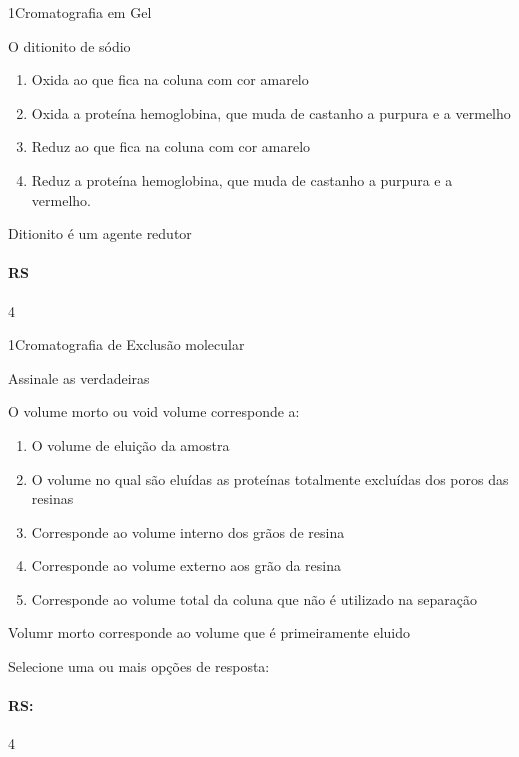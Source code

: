 \documentclass[\mainfilename]{subfiles}
\begin{document}
\begin{questionBox}1{Cromatografia em Gel}
    
    O ditionito de sódio
    \begin{enumerate}
        \item Oxida ao  que fica na coluna com cor amarelo
        \item Oxida a proteína hemoglobina, que muda de castanho a purpura e a vermelho
        \item Reduz ao  que fica na coluna com cor amarelo
        \item Reduz a proteína hemoglobina, que muda de castanho a purpura e a vermelho.
    \end{enumerate}

    Ditionito é um agente redutor

    \paragraph{RS} 4
    
\end{questionBox}

\begin{questionBox}1{Cromatografia de Exclusão molecular}
    
    Assinale as verdadeiras

    O volume morto ou void volume corresponde a:

    \begin{enumerate}
        \item O volume de eluição da amostra
        \item O volume no qual são eluídas as proteínas totalmente excluídas dos poros das resinas
        \item Corresponde ao volume interno dos grãos de resina
        \item Corresponde ao volume externo aos grão da resina
        \item Corresponde ao volume total da coluna que não é utilizado na separação
    \end{enumerate}

    Volumr morto corresponde ao volume que é primeiramente eluido

    Selecione uma ou mais opções de resposta:
    \paragraph{RS:} 4
    
\end{questionBox}
\end{document}
